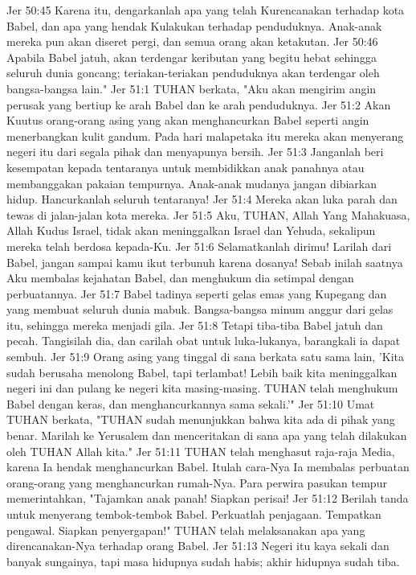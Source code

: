 Jer 50:45  Karena itu, dengarkanlah apa yang telah Kurencanakan terhadap kota Babel, dan apa yang hendak Kulakukan terhadap penduduknya. Anak-anak mereka pun akan diseret pergi, dan semua orang akan ketakutan.
Jer 50:46  Apabila Babel jatuh, akan terdengar keributan yang begitu hebat sehingga seluruh dunia goncang; teriakan-teriakan penduduknya akan terdengar oleh bangsa-bangsa lain."
Jer 51:1  TUHAN berkata, "Aku akan mengirim angin perusak yang bertiup ke arah Babel dan ke arah penduduknya.
Jer 51:2  Akan Kuutus orang-orang asing yang akan menghancurkan Babel seperti angin menerbangkan kulit gandum. Pada hari malapetaka itu mereka akan menyerang negeri itu dari segala pihak dan menyapunya bersih.
Jer 51:3  Janganlah beri kesempatan kepada tentaranya untuk membidikkan anak panahnya atau membanggakan pakaian tempurnya. Anak-anak mudanya jangan dibiarkan hidup. Hancurkanlah seluruh tentaranya!
Jer 51:4  Mereka akan luka parah dan tewas di jalan-jalan kota mereka.
Jer 51:5  Aku, TUHAN, Allah Yang Mahakuasa, Allah Kudus Israel, tidak akan meninggalkan Israel dan Yehuda, sekalipun mereka telah berdosa kepada-Ku.
Jer 51:6  Selamatkanlah dirimu! Larilah dari Babel, jangan sampai kamu ikut terbunuh karena dosanya! Sebab inilah saatnya Aku membalas kejahatan Babel, dan menghukum dia setimpal dengan perbuatannya.
Jer 51:7  Babel tadinya seperti gelas emas yang Kupegang dan yang membuat seluruh dunia mabuk. Bangsa-bangsa minum anggur dari gelas itu, sehingga mereka menjadi gila.
Jer 51:8  Tetapi tiba-tiba Babel jatuh dan pecah. Tangisilah dia, dan carilah obat untuk luka-lukanya, barangkali ia dapat sembuh.
Jer 51:9  Orang asing yang tinggal di sana berkata satu sama lain, 'Kita sudah berusaha menolong Babel, tapi terlambat! Lebih baik kita meninggalkan negeri ini dan pulang ke negeri kita masing-masing. TUHAN telah menghukum Babel dengan keras, dan menghancurkannya sama sekali.'"
Jer 51:10  Umat TUHAN berkata, "TUHAN sudah menunjukkan bahwa kita ada di pihak yang benar. Marilah ke Yerusalem dan menceritakan di sana apa yang telah dilakukan oleh TUHAN Allah kita."
Jer 51:11  TUHAN telah menghasut raja-raja Media, karena Ia hendak menghancurkan Babel. Itulah cara-Nya Ia membalas perbuatan orang-orang yang menghancurkan rumah-Nya. Para perwira pasukan tempur memerintahkan, "Tajamkan anak panah! Siapkan perisai!
Jer 51:12  Berilah tanda untuk menyerang tembok-tembok Babel. Perkuatlah penjagaan. Tempatkan pengawal. Siapkan penyergapan!" TUHAN telah melaksanakan apa yang direncanakan-Nya terhadap orang Babel.
Jer 51:13  Negeri itu kaya sekali dan banyak sungainya, tapi masa hidupnya sudah habis; akhir hidupnya sudah tiba.
